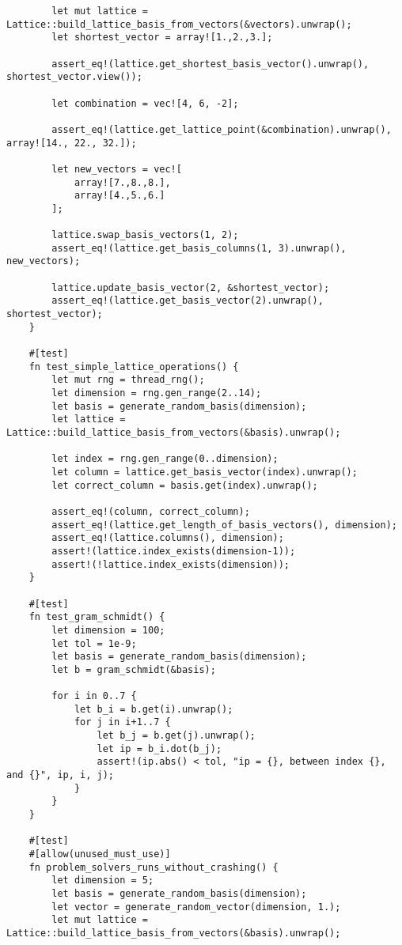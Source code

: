 \begin{verbatim}
        let mut lattice = Lattice::build_lattice_basis_from_vectors(&vectors).unwrap();
        let shortest_vector = array![1.,2.,3.];

        assert_eq!(lattice.get_shortest_basis_vector().unwrap(), shortest_vector.view());

        let combination = vec![4, 6, -2];

        assert_eq!(lattice.get_lattice_point(&combination).unwrap(), array![14., 22., 32.]);

        let new_vectors = vec![
            array![7.,8.,8.],
            array![4.,5.,6.]
        ];
        
        lattice.swap_basis_vectors(1, 2);
        assert_eq!(lattice.get_basis_columns(1, 3).unwrap(), new_vectors);

        lattice.update_basis_vector(2, &shortest_vector);
        assert_eq!(lattice.get_basis_vector(2).unwrap(), shortest_vector);
    }

    #[test]
    fn test_simple_lattice_operations() {
        let mut rng = thread_rng();
        let dimension = rng.gen_range(2..14);
        let basis = generate_random_basis(dimension);
        let lattice = Lattice::build_lattice_basis_from_vectors(&basis).unwrap();

        let index = rng.gen_range(0..dimension);
        let column = lattice.get_basis_vector(index).unwrap();
        let correct_column = basis.get(index).unwrap();

        assert_eq!(column, correct_column);
        assert_eq!(lattice.get_length_of_basis_vectors(), dimension);
        assert_eq!(lattice.columns(), dimension);
        assert!(lattice.index_exists(dimension-1));
        assert!(!lattice.index_exists(dimension));
    }

    #[test]
    fn test_gram_schmidt() {
        let dimension = 100;
        let tol = 1e-9;
        let basis = generate_random_basis(dimension);
        let b = gram_schmidt(&basis);
        
        for i in 0..7 {
            let b_i = b.get(i).unwrap();
            for j in i+1..7 {
                let b_j = b.get(j).unwrap();
                let ip = b_i.dot(b_j);
                assert!(ip.abs() < tol, "ip = {}, between index {}, and {}", ip, i, j);
            }
        }
    }

    #[test]
    #[allow(unused_must_use)]
    fn problem_solvers_runs_without_crashing() {
        let dimension = 5;
        let basis = generate_random_basis(dimension);
        let vector = generate_random_vector(dimension, 1.);
        let mut lattice = Lattice::build_lattice_basis_from_vectors(&basis).unwrap();


\end{verbatim}
